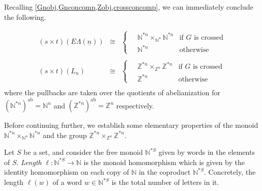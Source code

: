 \documentclass{amsbook} %
\newcommand{\N}{\mathbb{N}}
\newcommand{\ELn}{E\Lambda(\underline{n})}
\numberwithin{section}{chapter}
\begin{document}
Recalling \cref{Gnobj,Gnconcomp,Zobj,crossconcomp}, we can immediately conclude the following.

\begin{cor} \label{stpullback}
\[\begin{array}{rll} 
		(s \times t)(\ELn) & \cong & \begin{cases}
								\quad \mathbb{N}^{\ast n} \times_{\mathbb{N}^n} \mathbb{N}^{\ast n} & \text{if $G$ is crossed}\\
								\quad \mathbb{N}^{\ast n} & \text{otherwise}
							\end{cases} \\
		& & \\
		(s \times t)(L_n) & \cong & \begin{cases}
								\quad \mathbb{Z}^{\ast n} \times_{\mathbb{Z}^n} \mathbb{Z}^{\ast n}  & \text{if $G$ is crossed}\\
								\quad \mathbb{Z}^{\ast n} & \text{otherwise}
							\end{cases} \\
		\end{array}
\]
where the pullbacks are taken over the quotients of abelianization for $(\mathbb{N}^{\ast n})^{\mathrm{ab}} = \mathbb{N}^n$ and $(\mathbb{Z}^{\ast n})^{\mathrm{ab}} = \mathbb{Z}^n$ respectively.
\end{cor}

Before continuing further, we establish some elementary properties of the monoid $\mathbb{N}^{\ast n} \times_{\mathbb{N}^n} \mathbb{N}^{\ast n}$ and the group $\mathbb{Z}^{\ast n} \times_{\mathbb{Z}^n} \mathbb{Z}^{\ast n}$.

\begin{Defi}\label{length}
Let $S$ be a set, and consider the free monoid $\N^{*S}$ given by words in the elements of $S$. \emph{Length} $\ell \colon \N^{*S} \to \N$ is the monoid homomorphism which is given by the identity homomorphism on each copy of $\N$ in the coproduct $\N^{*S}$. Concretely, the length $\ell(w)$ of a word $w \in \N^{*S}$ is the total number of letters in it.
\end{Defi}
\end{document}
